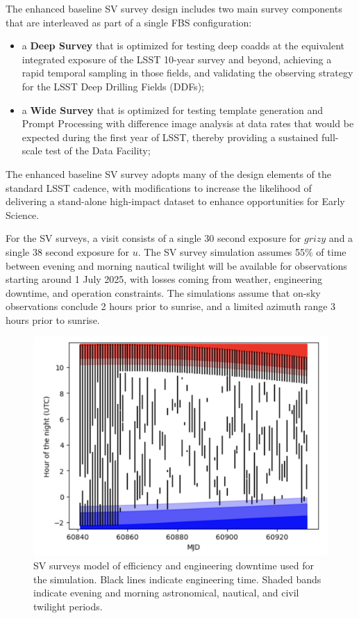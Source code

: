 The enhanced baseline SV survey design includes two main survey components that are interleaved as part of a single FBS configuration:
\begin{itemize}
        \item a \textbf{Deep Survey} that is optimized for testing deep coadds at the equivalent integrated exposure of the LSST 10-year survey and beyond, achieving a rapid temporal sampling in those fields, and validating the observing strategy for the LSST Deep Drilling Fields (DDFs);
        \item a \textbf{Wide Survey} that is optimized for testing template generation and Prompt Processing with difference image analysis at data rates that would be expected during the first year of LSST, thereby providing a sustained full-scale test of the Data Facility;
\end{itemize}
The enhanced baseline SV survey adopts many of the design elements of the standard LSST cadence, with modifications to increase the likelihood of delivering a stand-alone high-impact dataset to enhance opportunities for Early Science.

For the SV surveys, a visit consists of a single 30 second exposure for $grizy$ and a single 38 second exposure for $u$.
The SV survey simulation assumes 55\% of time between evening and morning nautical twilight will be available for observations starting around 1 July 2025, with losses coming from weather, engineering downtime, and operation constraints.
The simulations assume that on-sky observations conclude 2 hours prior to sunrise, and a limited azimuth range 3 hours prior to sunrise.


\begin{figure}[htbp]
    \begin{center}
    \includegraphics[width=1\textwidth]{./sv_surveys_uptime.png}
    \caption{SV surveys model of efficiency and engineering downtime used for the simulation. Black lines indicate engineering time. Shaded bands indicate evening and morning astronomical, nautical, and civil twilight periods.}
    \label{sv_surveys_uptime}
    \end{center}
\end{figure}

